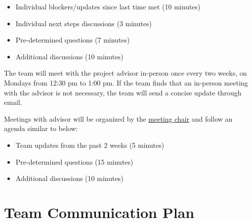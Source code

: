 \documentclass{article}
\begin{document}
\begin{itemize}
  \item Individual blockers/updates since last time met (10 minutes)
  \item Individual next steps discussions (3 minutes)
  \item Pre-determined questions (7 minutes)
  \item Additional discussions (10 minutes)
\end{itemize}

The team will meet with the project advisor in-person once every two weeks, on
Mondays from 12:30 pm to 1:00 pm. If the team finds that an in-person meeting
with the advisor is not necessary, the team will send a concise update through
email.

Meetings with advisor will be organized by the
\hyperref[role:meeting_chair]{meeting chair} and follow an agenda similar to
below:

\begin{itemize}
  \item Team updates from the past 2 weeks (5 minutes)
  \item Pre-determined questions (15 minutes)
  \item Additional discussions (10 minutes)
\end{itemize}

\section{Team Communication Plan}
\end{document}
